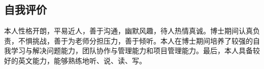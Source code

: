 \documentclass[10pt]{article} %
\begin{document}
\begin{paracol}{2}
	\section{自我评价}
	
	本人性格开朗，平易近人，善于沟通，幽默风趣，待人热情真诚。博士期间认真负责，不惧挑战，善于为老师分担压力，善于倾听。本人在博士期间培养了较强的自我学习与解决问题能力，团队协作与管理能力和项目管理能力。最后，本人具备较好的英文能力，能够熟练地听、说、读、写。

	
	
\end{paracol}

\newpage
\end{document}
